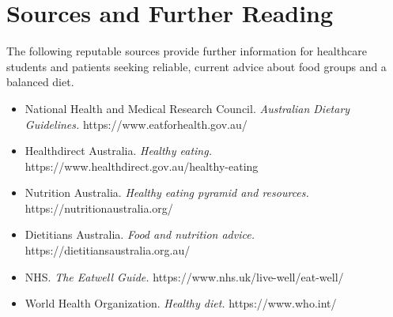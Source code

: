 \section*{Sources and Further Reading}
The following reputable sources provide further information for healthcare students and patients seeking reliable, current advice about food groups and a balanced diet.
\begin{itemize}
    \item National Health and Medical Research Council. \textit{Australian Dietary Guidelines.} https://www.eatforhealth.gov.au/
    \item Healthdirect Australia. \textit{Healthy eating.} https://www.healthdirect.gov.au/healthy-eating
    \item Nutrition Australia. \textit{Healthy eating pyramid and resources.} https://nutritionaustralia.org/
    \item Dietitians Australia. \textit{Food and nutrition advice.} https://dietitiansaustralia.org.au/
    \item NHS. \textit{The Eatwell Guide.} https://www.nhs.uk/live-well/eat-well/
    \item World Health Organization. \textit{Healthy diet.} https://www.who.int/
\end{itemize}
